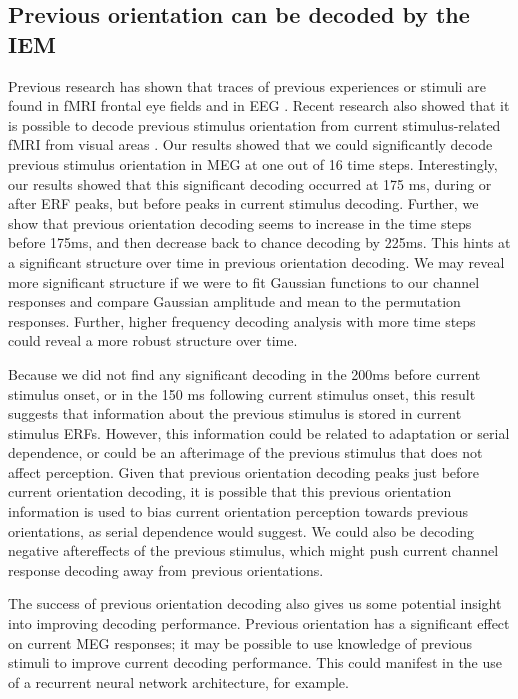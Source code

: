 \documentclass[../main.tex]{subfiles}
\begin{document}
\subsection*{Previous orientation can be decoded by the IEM}
Previous research has shown that traces of previous experiences or stimuli are found in fMRI frontal eye fields \citep{Papadimitriou} and in EEG \citep{BaeLuck}. Recent research also showed that it is possible to decode previous stimulus orientation from current stimulus-related fMRI from visual areas \citep{Sheehan2021.04.06.438664}. Our results showed that we could significantly decode previous stimulus orientation in MEG at one out of 16 time steps. Interestingly, our results showed that this significant decoding occurred at 175 ms, during or after ERF peaks, but before peaks in current stimulus decoding. Further, we show that previous orientation decoding seems to increase in the time steps before 175ms, and then decrease back to chance decoding by 225ms. This hints at a significant structure over time in previous orientation decoding. We may reveal more significant structure if we were to fit Gaussian functions to our channel responses and compare Gaussian amplitude and mean to the permutation responses. Further, higher frequency decoding analysis with more time steps could reveal a more robust structure over time.

Because we did not find any significant decoding in the 200ms before current stimulus onset, or in the 150 ms following current stimulus onset, this result suggests that information about the previous stimulus is stored in current stimulus ERFs. However, this information could be related to adaptation or serial dependence, or could be an afterimage of the previous stimulus that does not affect perception. Given that previous orientation decoding peaks just before current orientation decoding, it is possible that this previous orientation information is used to bias current orientation perception towards previous orientations, as serial dependence would suggest. We could also be decoding negative aftereffects of the previous stimulus, which might push current channel response decoding away from previous orientations.

The success of previous orientation decoding also gives us some potential insight into improving decoding performance. Previous orientation has a significant effect on current MEG responses; it may be possible to use knowledge of previous stimuli to improve current decoding performance. This could manifest in the use of a recurrent neural network architecture, for example.
\end{document}
